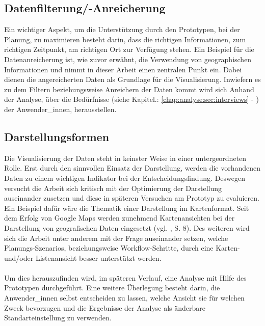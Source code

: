 \documentclass[Bachelorarbeit.tex]{subfiles}
\begin{document}
\subsection*{Datenfilterung/-Anreicherung}
Ein wichtiger Aspekt, um die Unterstützung durch den Prototypen, bei der Planung, zu maximieren besteht darin, dass die richtigen Informationen, zum richtigen Zeitpunkt, am richtigen Ort zur Verfügung stehen. 
Ein Beispiel für die Datenanreicherung ist, wie zuvor erwähnt, die Verwendung von geographischen Informationen und nimmt in dieser Arbeit einen zentralen Punkt ein. 
Dabei dienen die angereicherten Daten als Grundlage für die Visualisierung.
Inwiefern es zu dem Filtern beziehungsweise Anreichern der Daten kommt wird sich Anhand der Analyse, über die Bedürfnisse (siehe Kapitel.: \ref{chap:analyse:sec:interviews} - ) der Anwender\_innen, herausstellen.

\subsection*{Darstellungsformen}
Die Visualisierung der Daten steht in keinster Weise in einer untergeordneten Rolle.
Erst durch den sinnvollen Einsatz der Darstellung, werden die vorhandenen Daten zu einem wichtigen Indikator bei der Entscheidungsfindung.
Deswegen versucht die Arbeit sich kritisch mit der Optimierung der Darstellung auseinander zusetzen und diese in späteren Versuchen am Prototyp zu evaluieren.
Ein Beispiel dafür wäre die Thematik einer Darstellung im Kartenformat.
Seit dem Erfolg von Google Maps werden zunehmend Kartenansichten bei der Darstellung von geografischen Daten eingesetzt (vgl. \cite{Mitchell2008}, S. 8). 
Des weiteren wird sich die Arbeit unter anderem mit der Frage auseinander setzen, welche Planungs-Szenarios, beziehungsweise Workflow-Schritte, durch eine Karten- und/oder Listenansicht besser unterstützt werden.\\
\\
Um dies herauszufinden wird, im späteren Verlauf, eine Analyse mit Hilfe des Prototypen durchgeführt.
Eine weitere Überlegung besteht darin, die Anwender\_innen selbst entscheiden zu lassen, welche Ansicht sie für welchen Zweck bevorzugen und die Ergebnisse der Analyse als änderbare Standarteinstellung zu verwenden.
\end{document}

